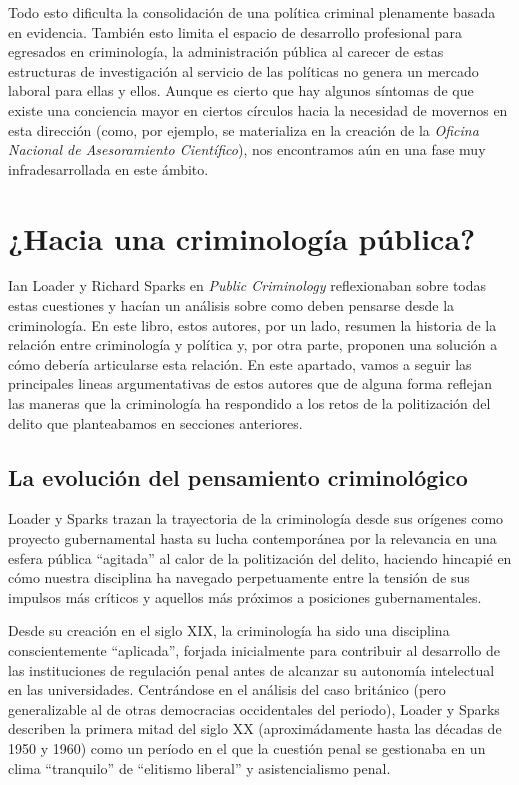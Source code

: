 \documentclass[
  spanish,
  letterpaper,
  DIV=11,
  numbers=noendperiod]{scrreprt}
\begin{document}
Todo esto dificulta la consolidación de una política criminal plenamente
basada en evidencia. También esto limita el espacio de desarrollo
profesional para egresados en criminología, la administración pública al
carecer de estas estructuras de investigación al servicio de las
políticas no genera un mercado laboral para ellas y ellos. Aunque es
cierto que hay algunos síntomas de que existe una conciencia mayor en
ciertos círculos hacia la necesidad de movernos en esta dirección (como,
por ejemplo, se materializa en la creación de la \emph{Oficina Nacional
de Asesoramiento Científico}), nos encontramos aún en una fase muy
infradesarrollada en este ámbito.

\section{¿Hacia una criminología
pública?}\label{hacia-una-criminologuxeda-puxfablica}

Ian Loader y Richard Sparks en \emph{Public Criminology} reflexionaban
sobre todas estas cuestiones y hacían un análisis sobre como deben
pensarse desde la criminología. En este libro, estos autores, por un
lado, resumen la historia de la relación entre criminología y política
y, por otra parte, proponen una solución a cómo debería articularse esta
relación. En este apartado, vamos a seguir las principales lineas
argumentativas de estos autores que de alguna forma reflejan las maneras
que la criminología ha respondido a los retos de la politización del
delito que planteabamos en secciones anteriores.

\subsection{La evolución del pensamiento
criminológico}\label{la-evoluciuxf3n-del-pensamiento-criminoluxf3gico}

Loader y Sparks trazan la trayectoria de la criminología desde sus
orígenes como proyecto gubernamental hasta su lucha contemporánea por la
relevancia en una esfera pública ``agitada'' al calor de la politización
del delito, haciendo hincapié en cómo nuestra disciplina ha navegado
perpetuamente entre la tensión de sus impulsos más críticos y aquellos
más próximos a posiciones gubernamentales.

Desde su creación en el siglo XIX, la criminología ha sido una
disciplina conscientemente ``aplicada'', forjada inicialmente para
contribuir al desarrollo de las instituciones de regulación penal antes
de alcanzar su autonomía intelectual en las universidades. Centrándose
en el análisis del caso británico (pero generalizable al de otras
democracias occidentales del periodo), Loader y Sparks describen la
primera mitad del siglo XX (aproximádamente hasta las décadas de 1950 y
1960) como un período en el que la cuestión penal se gestionaba en un
clima ``tranquilo'' de ``elitismo liberal'' y asistencialismo penal.
\end{document}

